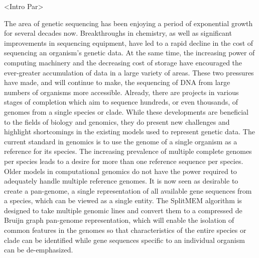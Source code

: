 \documentclass{paper}
\begin{document}
<Intro Par>
\newline\newline

The area of genetic sequencing has been enjoying a period of exponential
growth for several decades now. Breakthroughs in chemistry, as well as 
significant improvements in sequencing equipment, have led to a rapid 
decline in the cost of sequencing an organism's genetic data. At the 
same time, the increasing power of computing machinery and the decreasing
cost of storage have encouraged the ever-greater accumulation of data in 
a large variety of areas. These two pressures have made, and will 
continue to make, the sequencing of DNA from large numbers of organisms 
more accessible. Already, there are projects in various stages of 
completion which aim to sequence hundreds, or even thousands, of genomes 
from a single species or clade. While these developments are beneficial 
to the fields of biology and genomics, they do present new challenges 
and highlight shortcomings in the existing models used to represent 
genetic data. The current standard in genomics is to use the genome of a 
single organism as a reference for its species. The increasing prevalence
of multiple complete genomes per species leads to a desire for more than
one reference sequence per species. Older models in computational 
genomics do not have the power required to adequately handle multiple 
reference genomes. It is now seen as desirable to create a pan-genome, 
a single representation of all available gene sequences from a species, 
which can be viewed as a single entity. The SplitMEM algorithm is 
designed to take multiple genomic lines and convert them to a compressed
de Bruijn graph pan-genome representation, which will enable the 
isolation of common features in the genomes so that characteristics 
of the entire species or clade can be identified while gene sequences 
specific to an individual organism can be de-emphasized.
\end{document}
